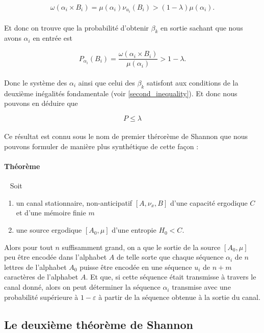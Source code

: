 	\[\omega(\alpha_i \times B_i)=\mu(\alpha_i)\nu_{u_i}(B_i)>(1-\lambda)\mu(\alpha_i).\]
	
	\paragraph{}
	Et donc on trouve que la probabilité d'obtenir $\beta_k$ en sortie sachant que nous avons $\alpha_i$ en entrée est
	
	\[P_{\alpha_i}(B_i)=\frac{\omega(\alpha_i \times B_i)}{\mu(\alpha_i)}>1-\lambda.\]
	
	\paragraph{}
	Donc le système des $\alpha_i$ ainsi que celui des $\beta_k$ satisfont aux conditions de la deuxième inégalités fondamentale (voir \ref{second_inequality}). 
	Et donc nous pouvons en déduire que
	
	\[P\le \lambda\]
	
	\paragraph{}
	Ce résultat est connu sous le nom de premier thérorème de Shannon que nous pouvons formuler de manière plus synthétique de cette façon :
	
	\paragraph{Théorème}\ 
	\newline
	Soit 
	\begin{enumerate}
		\item un canal stationnaire, non-anticipatif $[A,\nu_x,B]$ d'une capacité ergodique $C$ et d'une mémoire finie $m$
		\item une source ergodique $[A_0,\mu]$ d'une entropie $H_0<C$.
	\end{enumerate}
	Alors pour tout $n$ suffisamment grand, on a que le sortie de la source $[A_0,\mu]$ peu être encodée dans l'alphabet $A$ de telle sorte que
	chaque séquence $\alpha_i$ de $n$ lettres de l'alphabet $A_0$ puisse être encodée en une séquence $u_i$ de $n+m$ caractères de l'alphabet $A$. 
	Et que, si cette séquence était transmisse à travers le canal donné, alors on peut déterminer la séquence $\alpha_i$ transmise avec une probabilité 
	supérieure à $1-\varepsilon$ à partir de la séquence obtenue à la sortie du canal.
	
\subsection{Le deuxième théorème de Shannon}

